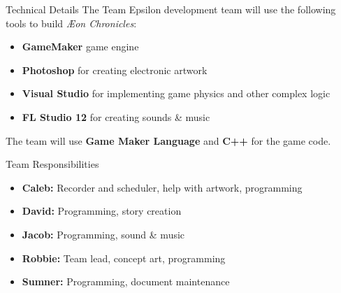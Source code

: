 \documentclass{teamepsilon}
\begin{document}
\begin{frame}{Technical Details}
    The Team Epsilon development team will use the following tools to build
    \textit{{\AE}on Chronicles}:

    \begin{itemize}
        \item \textbf{GameMaker} game engine
        \item \textbf{Photoshop} for creating electronic artwork
        \item \textbf{Visual Studio} for implementing game physics and other
            complex logic
        \item \textbf{FL Studio 12} for creating sounds \& music
    \end{itemize}

    The team will use \textbf{Game Maker Language} and \textbf{C++} for the game
    code.
\end{frame}

\begin{frame}{Team Responsibilities}
    \begin{itemize}
        \item \textbf{Caleb:} Recorder and scheduler, help with artwork,
            programming
        \item \textbf{David:} Programming, story creation
        \item \textbf{Jacob:} Programming, sound \& music
        \item \textbf{Robbie:} Team lead, concept art, programming
        \item \textbf{Sumner:} Programming, document maintenance
    \end{itemize}
\end{frame}
\end{document}
